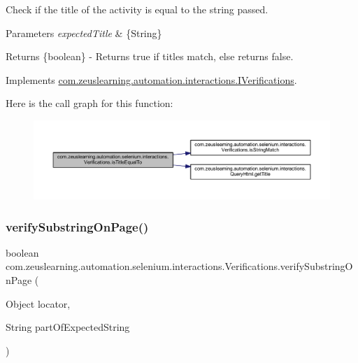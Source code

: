 Check if the title of the activity is equal to the string passed.


\begin{DoxyParams}{Parameters}
{\em expected\+Title} & \{String\} \\
\hline
\end{DoxyParams}
\begin{DoxyReturn}{Returns}
\{boolean\} -\/ Returns {\ttfamily true} if titles match, else returns {\ttfamily false}. 
\end{DoxyReturn}


Implements \hyperlink{interfacecom_1_1zeuslearning_1_1automation_1_1interactions_1_1IVerifications_a5174c7c27f09f3833d34dafc34b92ac8}{com.\+zeuslearning.\+automation.\+interactions.\+I\+Verifications}.

Here is the call graph for this function\+:
\nopagebreak
\begin{figure}[H]
\begin{center}
\leavevmode
\includegraphics[width=350pt]{d2/d6b/classcom_1_1zeuslearning_1_1automation_1_1selenium_1_1interactions_1_1Verifications_ad9c55fe144291c194e182b1b2b213da5_cgraph}
\end{center}
\end{figure}
\hypertarget{classcom_1_1zeuslearning_1_1automation_1_1selenium_1_1interactions_1_1Verifications_a6fbe5c6cd7a92208444c669cca7cb502}{}\label{classcom_1_1zeuslearning_1_1automation_1_1selenium_1_1interactions_1_1Verifications_a6fbe5c6cd7a92208444c669cca7cb502} 
\subsubsection{\texorpdfstring{verify\+Substring\+On\+Page()}{verifySubstringOnPage()}}
{\footnotesize\ttfamily boolean com.\+zeuslearning.\+automation.\+selenium.\+interactions.\+Verifications.\+verify\+Substring\+On\+Page (\begin{DoxyParamCaption}\item[{Object}]{locator,  }\item[{String}]{part\+Of\+Expected\+String }\end{DoxyParamCaption})\hspace{0.3cm}{\ttfamily [inline]}}

